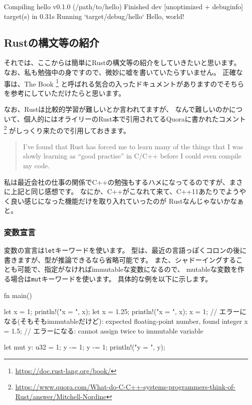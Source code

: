 \documentclass[mingoth,a4paper]{jsarticle}
\begin{document}
\begin{commandline}
   Compiling hello v0.1.0 (/path/to/hello)
    Finished dev [unoptimized + debuginfo] target(s) in 0.31s
     Running `target/debug/hello`
Hello, world!
\end{commandline}

\subsection{Rustの構文等の紹介}

それでは、ここからは簡単にRustの構文等の紹介をしていきたいと思います。
なお、私も勉強中の身ですので、微妙に嘘を書いていたらすいません。
正確な事は、The Book%
\footnote{\url{https://doc.rust-lang.org/book/}}%
と呼ばれる気合の入ったドキュメントがありますのでそちらを参考にしていただけたらと思います。

なお、Rustは比較的学習が難しいとか言われてますが、
なんで難しいのかについて、個人的にはオライリーのRust本で引用されてるQuoraに書かれたコメント%
\footnote{\url{https://www.quora.com/What-do-C-C++-systems-programmers-think-of-Rust/answer/Mitchell-Nordine}}%
がしっくり来たので引用しておきます。
\begin{quotation}
I've found that Rust has forced me to learn many of the things that I was slowly learning as
``good practise'' in C/C++ before I could even compile my code.
\end{quotation}
私は最近会社の仕事の関係でC++の勉強もするハメになってるのですが、まさに上記と同じ感想です。
なにか、C++がこなれて来て、C++11あたりでようやく良い感じになった機能だけを取り入れていったのが
Rustなんじゃないかなぁと。

\subsubsection{変数宣言}

変数の宣言は\texttt{let}キーワードを使います。
型は、最近の言語っぽくコロンの後に書きますが、型が推論できるなら省略可能です。
また、シャドーイングすることも可能で、指定がなければimmutableな変数になるので、
mutableな変数を作る場合は\texttt{mut}キーワードを使います。
具体的な例を以下に示します。

\begin{commandline}
fn main() {
    let x = 1;
    println!("x = {}", x);
    let x = 1.25;
    println!("x = {}", x);
    x = 1;   // エラーになる(そもそもimmutableだけど): expected floating-point number, found integer
    x = 1.5; // エラーになる: cannot assign twice to immutable variable

    let mut y: u32 = 1;
    y -= 1;
    y -= 1;
    println!("y = {}", y);
}
\end{commandline}
\end{document}
